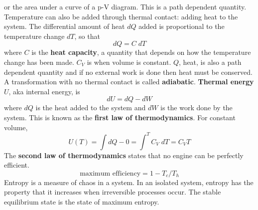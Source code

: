     or the area under a curve of a p-V diagram. This is a path dependent quantity. 
    \newline \indent
    Temperature can also be added through thermal contact: adding heat to the system. The differential amount of heat $dQ$ added is proportional to the temperature change $dT$, so that $$dQ = C \; dT$$ where $C$ is the \textbf{heat capacity}, a quantity that depends on how the temperature change has been made. $C_V$ is when volume is constant. $Q$, heat, is also a path dependent quantity and if no external work is done then heat must be conserved. A transformation with no thermal contact is called \textbf{adiabatic}.
    \newline \indent
    \textbf{Thermal energy} $U$, aka internal energy, is $$dU = dQ - dW$$ where $dQ$ is the heat added to the system and $dW$ is the work done by the system. This is known as the \textbf{first law of thermodynamics}. For constant volume,
    \begin{equation*}
        U(T) = \int dQ - 0 = \int^T C_V \; dT = C_V T
    \end{equation*}
    The \textbf{second law of thermodynamics} states that no engine can be perfectly efficient.
    \begin{equation*}
        \text{maximum efficiency} = 1 - T_c/T_h
    \end{equation*}
    Entropy is a measure of chaos in a system. In an isolated system, entropy has the property that it increases when irreversible processes occur.  The stable equilibrium state is the state of maximum entropy.
